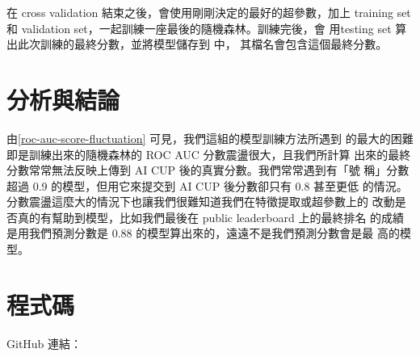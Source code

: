 \documentclass[12pt, a4paper]{article}
\begin{document}
        在 cross validation 結束之後，會使用剛剛決定的最好的超參數，加上
        training set 和 validation set，一起訓練一座最後的隨機森林。訓練完後，會
        用testing set 算出此次訓練的最終分數，並將模型儲存到  中，
        其檔名會包含這個最終分數。
    \section{分析與結論}
        由\autoref{roc-auc-score-fluctuation} 可見，我們這組的模型訓練方法所遇到
        的最大的困難即是訓練出來的隨機森林的 ROC AUC 分數震盪很大，且我們所計算
        出來的最終分數常常無法反映上傳到 AI CUP 後的真實分數。我們常常遇到有「號
        稱」分數超過 0.9 的模型，但用它來提交到 AI CUP 後分數卻只有 0.8 甚至更低
        的情況。分數震盪這麼大的情況下也讓我們很難知道我們在特徵提取或超參數上的
        改動是否真的有幫助到模型，比如我們最後在 public leaderboard 上的最終排名
        的成績是用我們預測分數是 0.88 的模型算出來的，遠遠不是我們預測分數會是最
        高的模型。
    \section{程式碼}
        GitHub 連結：
\end{document}
